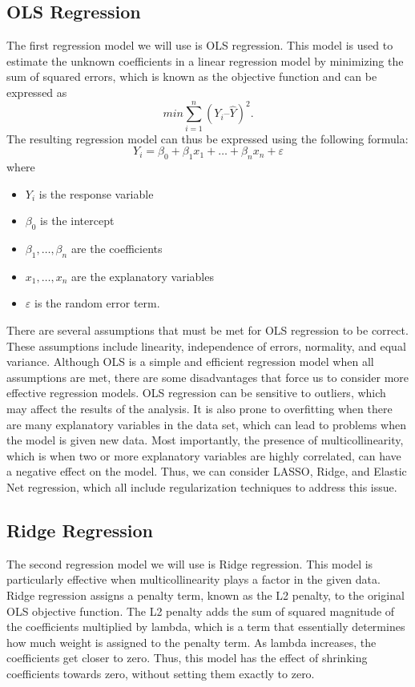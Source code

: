 \documentclass{article}
\begin{document}
\subsection{OLS Regression}
The first regression model we will use is OLS regression. This model is used to estimate the unknown coefficients in a linear regression model by minimizing the sum of squared errors, which is known as the objective function and can be expressed as $$min \sum_{i=1}^n(Y_i–\hat{Y})^2.$$ The resulting regression model can thus be expressed using the following formula: $$Y_i=\beta_0+\beta_1x_1+\ldots+\beta_nx_n+\varepsilon$$ where
\begin{itemize}
\item $Y_i$ is the response variable
\item $\beta_0$ is the intercept 
\item $\beta_1,\ldots, \beta_n$ are the coefficients
\item $x_1, \ldots, x_n$ are the explanatory variables
\item $\varepsilon$ is the random error term.
\end{itemize}

There are several assumptions that must be met for OLS regression to be correct. These assumptions include linearity, independence of errors, normality, and equal variance. Although OLS is a simple and efficient regression model when all assumptions are met, there are some disadvantages that force us to consider more effective regression models. OLS regression can be sensitive to outliers, which may affect the results of the analysis. It is also prone to overfitting when there are many explanatory variables in the data set, which can lead to problems when the model is given new data. Most importantly, the presence of multicollinearity, which is when two or more explanatory variables are highly correlated, can have a negative effect on the model. Thus, we can consider LASSO, Ridge, and Elastic Net regression, which all include regularization techniques to address this issue.

\subsection{Ridge Regression}
The second regression model we will use is Ridge regression. This model is particularly effective when multicollinearity plays a factor in the given data. Ridge regression assigns a penalty term, known as the L2 penalty, to the original OLS objective function. The L2 penalty adds the sum of squared magnitude of the coefficients multiplied by lambda, which is a term that essentially determines how much weight is assigned to the penalty term. As lambda increases, the coefficients get closer to zero. Thus, this model has the effect of shrinking coefficients towards zero, without setting them exactly to zero.
\end{document}
